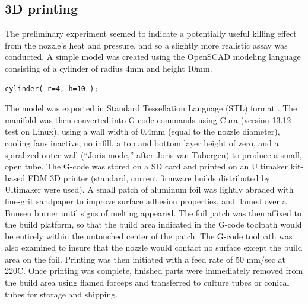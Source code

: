 \begin{refsection}
\subsection{3D printing}\label{3Dprinting}

The preliminary experiment seemed to indicate a potentially useful
killing effect from the nozzle's heat and pressure, and so a slightly
more realistic assay was conducted. A simple model was created using
the OpenSCAD \cite{OpenSCAD} modeling language consisting of a
cylinder of radius 4mm and height 10mm.

\begin{verbatim}
cylinder( r=4, h=10 );
\end{verbatim}

The model was exported in Standard Tessellation Language (STL) format
\cite{burns1993}. The manifold was then converted into G-code commands
\cite{gcode} using Cura (version 13.12-test on Linux), using a wall
width of 0.4mm (equal to the nozzle diameter), cooling fans inactive,
no infill, a top and bottom layer height of zero, and a spiralized
outer wall (``Joris mode,'' after Joris van Tubergen) to produce a
small, open tube.  The G-code was stored on a SD card and printed on
an Ultimaker kit-based FDM 3D printer (standard, current firmware
builds distributed by Ultimaker were used). A small patch of aluminum
foil was lightly abraded with fine-grit sandpaper to improve surface
adhesion properties, and flamed over a Bunsen burner until signs of
melting appeared. The foil patch was then affixed to the build
platform, so that the build area indicated in the G-code toolpath
would be entirely within the untouched center of the patch. The G-code
toolpath was also examined to insure that the nozzle would contact no
surface except the build area on the foil. Printing was then initiated
with a feed rate of 50 mm/sec at 220C. Once printing was complete,
finished parts were immediately removed from the build area using
flamed forceps and transferred to culture tubes or conical tubes for
storage and shipping.

\begin{figure}
    \centering



\end{figure}
\end{refsection}
